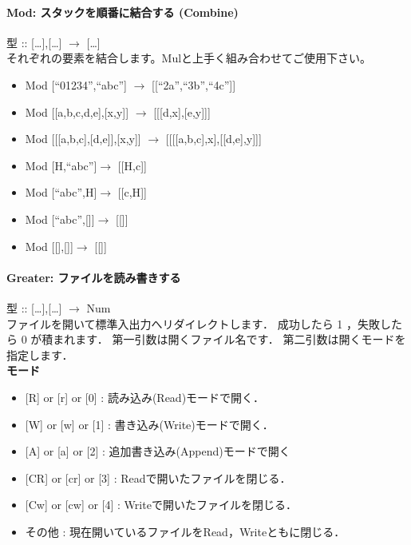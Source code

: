 \paragraph{Mod: スタックを順番に結合する (Combine)}

型 :: {[}\ldots{}{]},{[}\ldots{}{]} $\to$
{[}\ldots{}{]}\\それぞれの要素を結合します。Mulと上手く組み合わせてご使用下さい。

\begin{itemize}
\item
  Mod {[}``01234'',``abc''{]} $\to$
  {[}{[}``2a'',``3b'',``4c''{]}{]}
\item
  Mod {[}{[}a,b,c,d,e{]},{[}x,y{]}{]} $\to$
  {[}{[}{[}d,x{]},{[}e,y{]}{]}{]}
\item
  Mod {[}{[}{[}a,b,c{]},{[}d,e{]}{]},{[}x,y{]}{]} $\to$
  {[}{[}{[}{[}a,b,c{]},x{]},{[}{[}d,e{]},y{]}{]}{]}
\item
  Mod {[}H,``abc''{]}$\to$ {[}{[}H,c{]}{]}
\item
  Mod {[}``abc'',H{]}$\to$ {[}{[}c,H{]}{]}
\item
  Mod {[}``abc'',{[}{]}{]}$\to$ {[}{[}{]}{]}
\item
  Mod {[}{[}{]},{[}{]}{]}$\to$ {[}{[}{]}{]}
\end{itemize}

\paragraph{Greater: ファイルを読み書きする}

型 :: {[}\ldots{}{]},{[}\ldots{}{]} $\to$
Num\\ファイルを開いて標準入出力へリダイレクトします． 成功したら 1
，失敗したら 0 が積まれます． 第一引数は開くファイル名です．
第二引数は開くモードを指定します．\\\textbf{モード}

\begin{itemize}
\item
  {[}R{]} or {[}r{]} or {[}0{]} : 読み込み(Read)モードで開く．
\item
  {[}W{]} or {[}w{]} or {[}1{]} : 書き込み(Write)モードで開く．
\item
  {[}A{]} or {[}a{]} or {[}2{]} : 追加書き込み(Append)モードで開く
\item
  {[}CR{]} or {[}cr{]} or {[}3{]} : Readで開いたファイルを閉じる．
\item
  {[}Cw{]} or {[}cw{]} or {[}4{]} : Writeで開いたファイルを閉じる．
\item
  その他 : 現在開いているファイルをRead，Writeともに閉じる．
\end{itemize}

